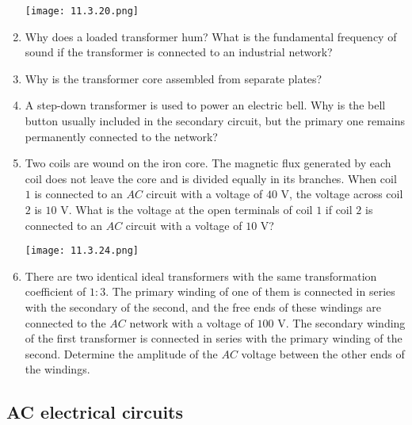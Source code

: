 \documentclass{article}
\begin{document}
\begin{enumerate}[label=11.3.\arabic*]
\begin{center}
    \texttt{[image: 11.3.20.png]}
\end{center}

\item Why does a loaded transformer hum? What is the fundamental frequency of sound if the transformer is connected to an industrial network?

\item Why is the transformer core assembled from separate plates?

\item A step-down transformer is used to power an electric bell. Why is the bell button usually included in the secondary circuit, but the primary one remains permanently connected to the network?

\item Two coils are wound on the iron core. The magnetic flux generated by each coil does not leave the core and is divided equally in its branches. When coil $1$ is connected to an $AC$ circuit with a voltage of $40$ V, the voltage across coil $2$ is $10$ V. What is the voltage at the open terminals of coil $1$ if coil $2$ is connected to an $AC$ circuit with a voltage of $10$ V?

\begin{center}
    \texttt{[image: 11.3.24.png]}
\end{center}

\item There are two identical ideal transformers with the same transformation coefficient of $1 : 3$. The primary winding of one of them is connected in series with the secondary of the second, and the free ends of these windings are connected to the $AC$ network with a voltage of $100$ V. The secondary winding of the first transformer is connected in series with the primary winding of the second. Determine the amplitude of the $AC$ voltage between the other ends of the windings.


\end{enumerate}


\subsection{AC electrical circuits}
\end{document}
